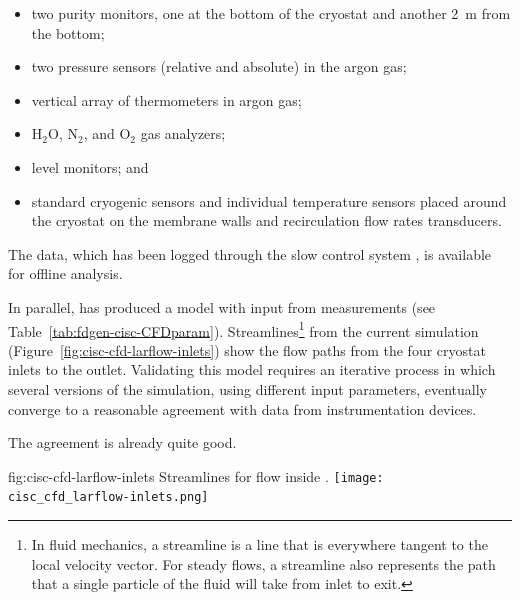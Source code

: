 \begin{itemize}
\item two purity monitors, one at the bottom of the cryostat and another 2~m from the bottom;
\item two pressure sensors (relative and absolute) in the argon gas;
\item vertical array of thermometers in argon gas;
\item H$_{2}$O, N$_{2}$, and O$_{2}$ gas analyzers; 
\item {} level monitors; and
\item standard cryogenic sensors 
and individual temperature sensors placed around the cryostat on the membrane walls and recirculation flow rates transducers.
\end{itemize}

The data, which has been logged through the  slow control system \cite{pdspdcs_proc}, is available for offline analysis. %


In parallel,  has produced a   model %
with input from  measurements (see Table~\ref{tab:fdgen-cisc-CFDparam}). Streamlines\footnote{In fluid mechanics, a streamline is a line that is everywhere tangent to the local velocity vector. For steady flows, a streamline also represents the path that a single particle of the fluid will take from inlet to exit.} from the current  simulation (Figure~\ref{fig:cisc-cfd-larflow-inlets}) show the flow paths from the four cryostat inlets to the outlet. Validating this model requires an iterative process in which several versions of the  simulation, using different input parameters, eventually %
converge %
to a reasonable agreement with data from instrumentation devices. 



The agreement is already quite good. %
\begin{dunefigure}{fig:cisc-cfd-larflow-inlets}
  {Streamlines for  flow inside  .}
  \texttt{[image: cisc\_cfd\_larflow-inlets.png]}
\end{dunefigure}



